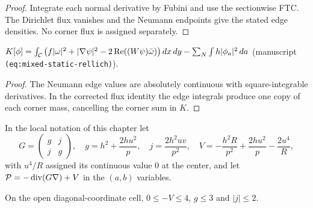\begin{proof}
\leanok
Integrate each normal derivative by Fubini and use the sectionwise
FTC. The Dirichlet flux vanishes and the Neumann endpoints give the
stated edge densities. No corner flux is assigned separately.
\end{proof}

\begin{lemma}
\label{lem:mixed-rellich}
\leanok
$K[\phi]=\int_{\mathcal{C}}\big(f|\omega|^2+|\nabla\psi|^2-2\operatorname{Re}((W\psi)\bar\omega)\big)\,dx\,dy
-\sum_N\int h|\phi_a|^2\,da$ (manuscript \texttt{(eq:mixed-static-rellich)}).
\end{lemma}

\begin{proof}
\leanok
The Neumann edge values are absolutely continuous with square-integrable
derivatives. In the corrected flux identity the edge integrals produce
one copy of each corner mass, cancelling the corner sum in $K$.
\end{proof}

\begin{definition}
\label{def:mixed-coefficients}
\leanok
In the local notation of this chapter let
\[
  G=\begin{pmatrix}g&j\\j&g\end{pmatrix},\quad g=h^2+\frac{2hu^2}p,\quad
  j=\frac{2h^2uv}{p^2},\quad V=-\frac{h^2R}{p^2}+\frac{2hu^2}p-\frac{2u^4}R,
\]
with $u^4/R$ assigned its continuous value $0$ at the center, and let
$\mathcal P=-\operatorname{div}(G\nabla)+V$ in the $(a,b)$ variables.
\end{definition}

\begin{lemma}
\label{lem:mixed-coefficient-bounds}
\leanok
On the open diagonal-coordinate cell, $0\le-V\le4$, $g\le3$ and $|j|\le2$.
\end{lemma}

